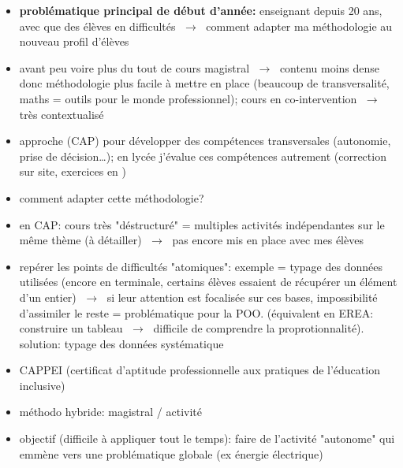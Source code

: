 \documentclass[a4paper,11pt]{article}
\begin{document}
\begin{itemize}
    \item \textbf{problématique principal de début d'année:} enseignant depuis 20 ans, avec que des élèves en difficultés $\;\rightarrow\;$ comment adapter ma méthodologie au nouveau profil d'élèves
    \item avant peu voire plus du tout de cours magistral $\;\rightarrow\;$ contenu moins dense donc méthodologie plus facile à mettre en place (beaucoup de transversalité, maths = outils pour le monde professionnel); cours en co-intervention $\;\rightarrow\;$ très contextualisé
    \item approche (CAP) pour développer des compétences transversales (autonomie, prise de décision\dots); en lycée j'évalue ces compétences autrement (correction sur site, exercices en )
    \item comment adapter cette méthodologie?
    \item en CAP: cours très "déstructuré" = multiples activités indépendantes sur le même thème (à détailler) $\;\rightarrow\;$ pas encore mis en place avec mes élèves
    \item repérer les points de difficultés "atomiques": exemple = typage des données utilisées (encore en terminale, certains élèves essaient de récupérer un élément d'un entier) $\;\rightarrow\;$ si leur attention est focalisée sur ces bases, impossibilité d'assimiler le reste = problématique pour la POO. (équivalent en EREA: construire un tableau $\;\rightarrow\;$ difficile de comprendre la proprotionnalité). solution: typage des données systématique
    \item CAPPEI (certificat d'aptitude professionnelle aux pratiques de l'éducation inclusive)
    \item méthodo hybride: magistral / activité
    \item objectif (difficile à appliquer tout le temps): faire de l'activité "autonome" qui emmène vers une problématique globale (ex énergie électrique)
\end{itemize}
\end{document}
